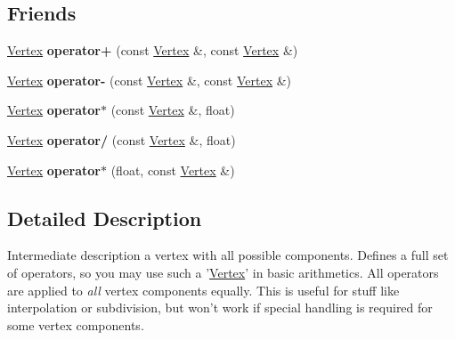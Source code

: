 \subsection*{Friends}
\begin{DoxyCompactItemize}
\item 
\hypertarget{class_assimp_1_1_vertex_a63d8efb7ec1db3fdbc0a37e15f579256}{\hyperlink{struct_assimp_1_1_m_d2_1_1_vertex}{Vertex} {\bfseries operator+} (const \hyperlink{struct_assimp_1_1_m_d2_1_1_vertex}{Vertex} \&, const \hyperlink{struct_assimp_1_1_m_d2_1_1_vertex}{Vertex} \&)}\label{class_assimp_1_1_vertex_a63d8efb7ec1db3fdbc0a37e15f579256}

\item 
\hypertarget{class_assimp_1_1_vertex_aa083de147d357c0fb18f4424dc36d530}{\hyperlink{struct_assimp_1_1_m_d2_1_1_vertex}{Vertex} {\bfseries operator-\/} (const \hyperlink{struct_assimp_1_1_m_d2_1_1_vertex}{Vertex} \&, const \hyperlink{struct_assimp_1_1_m_d2_1_1_vertex}{Vertex} \&)}\label{class_assimp_1_1_vertex_aa083de147d357c0fb18f4424dc36d530}

\item 
\hypertarget{class_assimp_1_1_vertex_a5ad9c80004bd1b1a88baebb6ea38ec95}{\hyperlink{struct_assimp_1_1_m_d2_1_1_vertex}{Vertex} {\bfseries operator$\ast$} (const \hyperlink{struct_assimp_1_1_m_d2_1_1_vertex}{Vertex} \&, float)}\label{class_assimp_1_1_vertex_a5ad9c80004bd1b1a88baebb6ea38ec95}

\item 
\hypertarget{class_assimp_1_1_vertex_a580dcf5ef6124c9742099e0858a43560}{\hyperlink{struct_assimp_1_1_m_d2_1_1_vertex}{Vertex} {\bfseries operator/} (const \hyperlink{struct_assimp_1_1_m_d2_1_1_vertex}{Vertex} \&, float)}\label{class_assimp_1_1_vertex_a580dcf5ef6124c9742099e0858a43560}

\item 
\hypertarget{class_assimp_1_1_vertex_a7d0d25c31e43d5c4d28dbe6c8f31956f}{\hyperlink{struct_assimp_1_1_m_d2_1_1_vertex}{Vertex} {\bfseries operator$\ast$} (float, const \hyperlink{struct_assimp_1_1_m_d2_1_1_vertex}{Vertex} \&)}\label{class_assimp_1_1_vertex_a7d0d25c31e43d5c4d28dbe6c8f31956f}

\end{DoxyCompactItemize}


\subsection{Detailed Description}
Intermediate description a vertex with all possible components. Defines a full set of operators, so you may use such a '\hyperlink{class_assimp_1_1_vertex}{Vertex}' in basic arithmetics. All operators are applied to {\itshape all} vertex components equally. This is useful for stuff like interpolation or subdivision, but won't work if special handling is required for some vertex components. 

